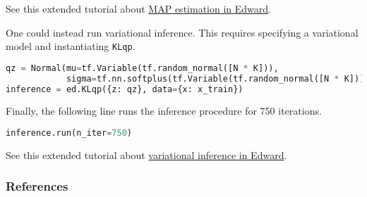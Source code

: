 See this extended tutorial about
\href{/tutorials/map}{MAP estimation in Edward}.

One could instead run variational inference. This requires specifying
a variational model and instantiating \texttt{KLqp}.
\begin{lstlisting}[language=Python]
qz = Normal(mu=tf.Variable(tf.random_normal([N * K])),
            sigma=tf.nn.softplus(tf.Variable(tf.random_normal([N * K]))))
inference = ed.KLqp({z: qz}, data={x: x_train})
\end{lstlisting}
Finally, the following line runs the inference procedure for 750
iterations.
\begin{lstlisting}[language=Python]
inference.run(n_iter=750)
\end{lstlisting}
See this extended tutorial about
\href{/tutorials/variational-inference}{variational inference in Edward}.

\subsubsection{References}

